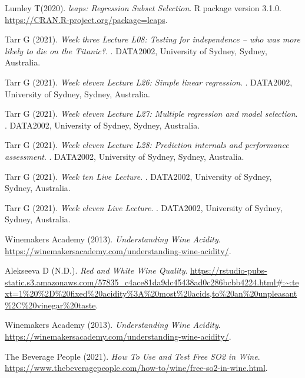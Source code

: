 \documentclass[letterpaper,8pt,twocolumn,twoside,]{pinp}
\begin{document}
\begin{thebibliography}{3}
\bibitem[{Lumley T(2020)}]{}
Lumley T(2020).
\newblock \emph{leaps: Regression Subset Selection}.
\newblock  R package version 3.1.0. \urlprefix\url{https://CRAN.R-project.org/package=leaps}.

\bibitem[{Tarr G (2021)}]{}
Tarr G (2021).
\newblock \emph{Week three Lecture L08: Testing for independence – who was more likely to die on the Titanic?}.
. DATA2002, University of Sydney, Sydney, Australia. 

\bibitem[{Tarr G (2021)}]{}
Tarr G (2021).
\newblock \emph{Week eleven Lecture L26: Simple linear regression}.
. DATA2002, University of Sydney, Sydney, Australia. 

\bibitem[{Tarr G (2021)}]{}
Tarr G (2021).
\newblock \emph{Week eleven Lecture L27: Multiple regression and model selection}.
. DATA2002, University of Sydney, Sydney, Australia. 

\bibitem[{Tarr G (2021)}]{}
Tarr G (2021).
\newblock \emph{Week eleven Lecture L28: Prediction internals and performance assessment}.
. DATA2002, University of Sydney, Sydney, Australia. 

\bibitem[{Tarr G (2021)}]{}
Tarr G (2021).
\newblock \emph{Week ten Live Lecture}.
. DATA2002, University of Sydney, Sydney, Australia. 

\bibitem[{Tarr G (2021)}]{}
Tarr G (2021).
\newblock \emph{Week eleven Live Lecture}.
. DATA2002, University of Sydney, Sydney, Australia. 

Winemakers Academy (2013).
\newblock \emph{Understanding Wine Acidity}.
\newblock \urlprefix\url{https://winemakersacademy.com/understanding-wine-acidity/}.

\bibitem[{Alekseeva D (N.D.)}]{}
Alekseeva D (N.D.).
\newblock \emph{Red and White Wine Quality}.
\newblock \urlprefix\url{https://rstudio-pubs-static.s3.amazonaws.com/57835_c4ace81da9dc45438ad0c286bcbb4224.html#:~:text=1%20%2D%20fixed%20acidity%3A%20most%20acids,to%20an%20unpleasant%2C%20vinegar%20taste}.

Winemakers Academy (2013).
\newblock \emph{Understanding Wine Acidity}.
\newblock \urlprefix\url{https://winemakersacademy.com/understanding-wine-acidity/}.

The Beverage People (2021).
\newblock \emph{How To Use and Test Free SO2 in Wine}.
\newblock \urlprefix\url{https://www.thebeveragepeople.com/how-to/wine/free-so2-in-wine.html}.


\end{thebibliography}
\end{document}
